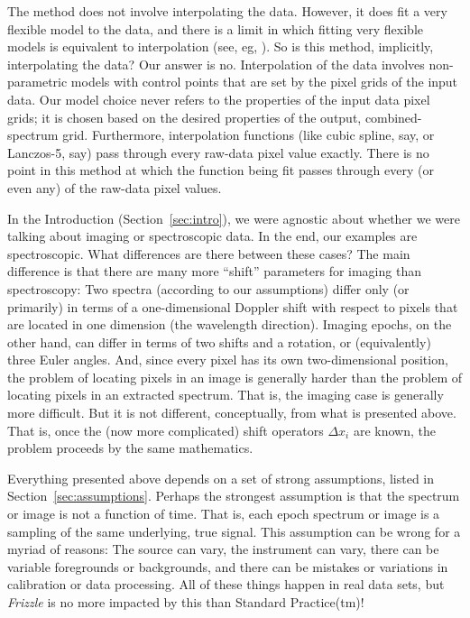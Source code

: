 \documentclass[modern, linenumbers]{aastex631}
\newcommand{\sectionname}{Section}
\newcommand{\secref}[1]{\sectionname~\ref{#1}}
\newcommand{\name}{\textsl{Frizzle}}
\begin{document}
The method does not involve interpolating the data.
However, it does fit a very flexible model to the data, and there is a limit in which fitting very flexible models is equivalent to interpolation (see, eg, \citealt{fittingflexible}).
So is this method, implicitly, interpolating the data?
Our answer is no.
Interpolation of the data involves non-parametric models with control points that are set by the pixel grids of the input data.
Our model choice never refers to the properties of the input data pixel grids; it is chosen based on the desired properties of the output, combined-spectrum grid.
Furthermore, interpolation functions (like cubic spline, say, or Lanczos-5, say) pass through every raw-data pixel value exactly.
There is no point in this method at which the function being fit passes through every (or even any) of the raw-data pixel values.

In the Introduction (\secref{sec:intro}), we were agnostic about whether we were talking about imaging or spectroscopic data.
In the end, our examples are spectroscopic.
What differences are there between these cases?
The main difference is that there are many more ``shift'' parameters for imaging than spectroscopy:
Two spectra (according to our assumptions) differ only (or primarily) in terms of a one-dimensional Doppler shift with respect to pixels that are located in one dimension (the wavelength direction).
Imaging epochs, on the other hand, can differ in terms of two shifts and a rotation, or (equivalently) three Euler angles.
And, since every pixel has its own two-dimensional position, the problem of locating pixels in an image is generally harder than the problem of locating pixels in an extracted spectrum.
That is, the imaging case is generally more difficult.
But it is not different, conceptually, from what is presented above.
That is, once the (now more complicated) shift operators $\Delta x_i$ are known, the problem proceeds by the same mathematics.

Everything presented above depends on a set of strong assumptions, listed in \secref{sec:assumptions}.
Perhaps the strongest assumption is that the spectrum or image is not a function of time.
That is, each epoch spectrum or image is a sampling of the same underlying, true signal.
This assumption can be wrong for a myriad of reasons:
The source can vary, the instrument can vary, there can be variable foregrounds or backgrounds, and there can be mistakes or variations in calibration or data processing.
All of these things happen in real data sets, but \name{} is no more impacted by this than Standard Practice(tm)!
\end{document}
